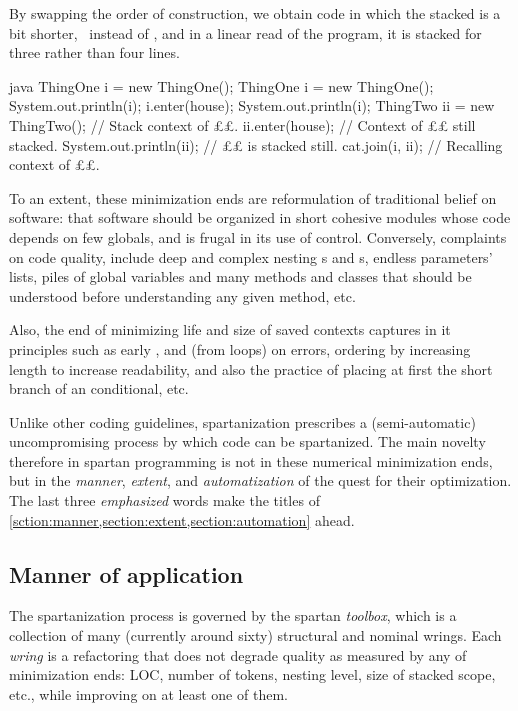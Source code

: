 \begin{enumerate}
  By swapping the order of construction, we obtain code in which the stacked is
  a bit shorter,~ instead of , and in a linear read of the
  program, it is stacked for three rather than four lines.

\begin{code}[minipage,width=54ex]{java}
ThingOne i = new ThingOne();
ThingOne i = new ThingOne();
System.out.println(i);
i.enter(house);
System.out.println(i);
ThingTwo ii = new ThingTwo(); // Stack context of ££.
ii.enter(house); // Context of ££ still stacked.
System.out.println(ii); // ££ is stacked still.
cat.join(i, ii); // Recalling context of ££.
  \end{code}
\end{enumerate}

To an extent, these minimization ends are reformulation of traditional
belief on software: that software should be organized in short cohesive modules
whose code depends on few globals, and is frugal in its use of control.
Conversely, complaints on code quality, include deep and complex nesting
s and s, endless parameters' lists, piles of global variables
and many methods and classes that should be understood before understanding any
given method, etc.

Also, the end of minimizing life and size of saved contexts captures in it
principles such as early ,  and  (from loops) on
errors, ordering by increasing length to increase readability, and also the
practice of placing at first the short branch of an  conditional, etc.

Unlike other coding guidelines, spartanization prescribes a (semi-automatic)
uncompromising process by which code can be spartanized.  The main novelty
therefore in spartan programming is not in these numerical minimization ends,
but in the \emph{manner}, \emph{extent}, and \emph{automatization} of the quest
for their optimization. The last three \emph{emphasized} words make the titles
of \cref{sction:manner,section:extent,section:automation} ahead.

\subsection{Manner of application}
\label{section:manner}
The spartanization process is governed by the spartan
\emph{toolbox}, which is a collection of many (currently around sixty)
structural and nominal wrings. Each \emph{wring} is a refactoring that does
not degrade quality as measured by any of minimization ends: LOC, number of
tokens, nesting level, size of stacked scope, etc., while improving on at least
one of them.

